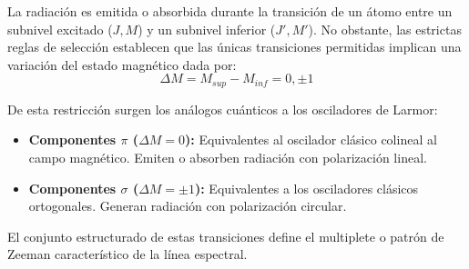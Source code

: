 La radiación es emitida o absorbida durante la transición de un átomo entre un subnivel excitado ($J, M$) y un subnivel inferior ($J', M'$). No obstante, las estrictas reglas de selección establecen que las únicas transiciones permitidas implican una variación del estado magnético dada por:
\begin{equation}
    \Delta M = M_{sup} - M_{inf} = 0, \pm 1
\end{equation}

De esta restricción surgen los análogos cuánticos a los osciladores de Larmor:
\begin{itemize}
    \item \textbf{Componentes $\pi$ ($\Delta M = 0$):} Equivalentes al oscilador clásico colineal al campo magnético. Emiten o absorben radiación con polarización lineal.
    \item \textbf{Componentes $\sigma$ ($\Delta M = \pm 1$):} Equivalentes a los osciladores clásicos ortogonales. Generan radiación con polarización circular.
\end{itemize}

El conjunto estructurado de estas transiciones define el multiplete o patrón de Zeeman característico de la línea espectral.

